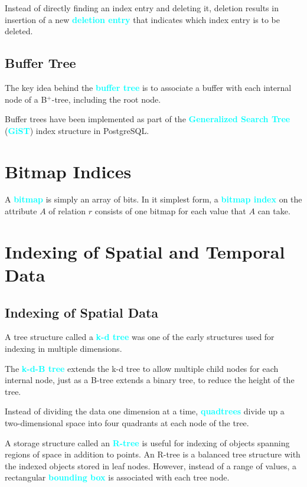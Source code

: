 \documentclass[a4paper,12pt,twoside,openany]{book}
\newcommand{\textcy}[1]{\textbf{\textcolor{cyan}{#1}}}
\begin{document}
Instead of directly finding an index entry and deleting it, deletion results in insertion of a new \textcy{deletion entry} that indicates which index entry is to be deleted.

\subsection{Buffer Tree}

The key idea behind the \textcy{buffer tree} is to associate a buffer with each internal node of a B$^+$-tree, including the root node.

Buffer trees have been implemented as part of the \textcy{Generalized Search Tree} (\textcy{GiST}) index structure in PostgreSQL.

\section{Bitmap Indices}

A \textcy{bitmap} is simply an array of bits. In it simplest form, a \textcy{bitmap index} on the attribute $A$ of relation $r$ consists of one bitmap for each value that $A$ can take.

\section{Indexing of Spatial and Temporal Data}
\subsection{Indexing of Spatial Data}

A tree structure called a \textcy{k-d tree} was one of the early structures used for indexing in multiple dimensions.

The \textcy{k-d-B tree} extends the k-d tree to allow multiple child nodes for each internal node, just as a B-tree extends a binary tree, to reduce the height of the tree.

Instead of dividing the data one dimension at a time, \textcy{quadtrees} divide up a two-dimensional space into four quadrants at each node of the tree.

A storage structure called an \textcy{R-tree} is useful for indexing of objects spanning regions of space in addition to points. An R-tree is a balanced tree structure with the indexed objects stored in leaf nodes. However, instead of a range of values, a rectangular \textcy{bounding box} is associated with each tree node.
\end{document}

